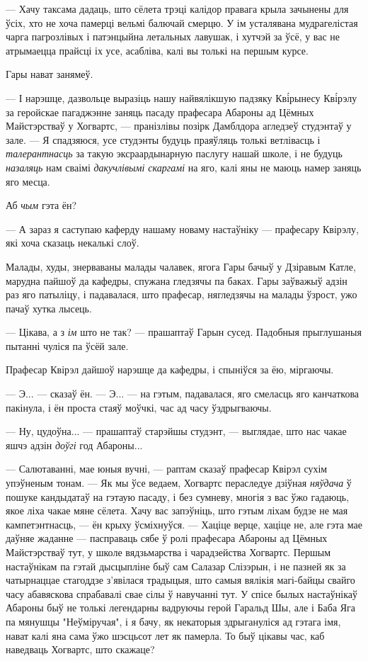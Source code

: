 --- Хачу таксама дадаць, што сёлета трэці калідор правага крыла зачынены для ўсіх,
хто не хоча памерці вельмі балючай смерцю. У ім усталявана мудрагелістая 
чарга пагрозлівых і патэнцыйна летальных лавушак, і хутчэй за ўсё, у вас 
не атрымаецца прайсці іх усе, асабліва, калі вы толькі на першым курсе.

Гары нават занямеў.

--- І нарэшце, дазвольце выразіць нашу найвялікшую падзяку Кв\'ірынесу Кв\'ірэлу за
геройскае пагаджэнне заняць пасаду прафесара Абароны ад Цёмных Майстэрстваў у Хогвартс, ---
пранізлівы позірк Дамблдора агледзеў студэнтаў у зале. ---
Я спадзяюся, усе студэнты будуць праяўляць толькі ветлівасць і \emph{талерантнасць} 
за такую эксраардынарную паслугу нашай школе, і не будуць \emph{назаляць} нам 
сваімі \emph{дакучлівымі скаргамі} на яго, калі яны не маюць намер заняць яго месца.

Аб \emph{чым} гэта ён?

--- А зараз я саступаю каферду нашаму новаму настаўніку --- прафесару Квірэлу, які 
хоча сказаць некалькі слоў.

Малады, худы, знерваваны малады чалавек, ягога Гары бачыў у Дзіравым Катле, марудна
пайшоў да кафедры, спужана гледзячы па баках. Гары заўважыў адзін раз яго патыліцу, і
падавалася, што прафесар, нягледзячы на малады ўзрост, ужо пачаў хутка лысець.

--- Цікава, а з \emph{ім} што не так? --- прашаптаў Гарын сусед. Падобныя прыглушаныя
пытанні чуліся па ўсёй зале. 

Прафесар Квірэл дайшоў нарэшце да кафедры, і спыніўся за ёю, міргаючы.

--- Э... --- сказаў ён. --- Э... --- на гэтым, падавалася, яго смеласць яго канчаткова
пакінула, і ён проста стаяў моўчкі, час ад часу ўздрыгваючы. 

--- Ну, цудоўна... --- прашаптаў старэйшы студэнт, --- выглядае, што нас чакае яшчэ адзін 
\emph{доўгі} год Абароны...

--- Салютаванні, мае юныя вучні, --- раптам сказаў прафесар Квірэл сухім упэўненым
тонам. --- Як мы ўсе ведаем, Хогвартс пераследуе дзіўная \emph{няўдача} ў 
пошуке кандыдатаў на гэтаую пасаду, і без сумневу, многія з вас ўжо гадаюць, якое 
ліха чакае мяне сёлета. Хачу вас запэўніць, што гэтым ліхам будзе не мая кампетэнтнасць,
--- ён крыху ўсміхнуўся. --- Хаціце верце, хаціце не, але гэта мае даўняе жаданне ---
пасправаць сябе ў ролі прафесара Абароны ад Цёмных Майстэрстваў тут, у школе 
вядзьмарства і чарадзейства Хогвартс. Першым настаўнікам па гэтай дысцыпліне быў 
сам Салазар Слізэрын, і не пазней як за чатырнаццае стагоддзе з'явілася традыцыя, 
што самыя вялікія магі-байцы свайго часу абавяскова спрабавалі свае сілы ў навучанні 
тут. У спісе былых настаўнікаў Абароны быў не толькі легендарны вадруючы герой 
Гаральд Шы, але і Баба Яга па мянушцы "Неўміручая", і я бачу, як некаторыя 
здрыгануліся ад гэтага імя, нават калі яна сама ўжо шэсцьсот лет як памерла. 
То быў цікавы час, каб наведваць Хогвартс, што скажаце?

